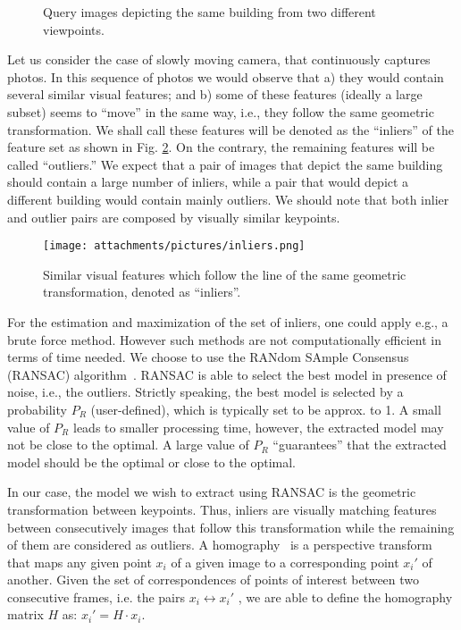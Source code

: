     \begin{figure}[htp!]
        \centering
        \caption{Query images depicting the same building from two different viewpoints.}
        \label{fig:demo_features}
    \end{figure}
    
Let us consider the case of slowly moving camera, that continuously captures photos. In this sequence of photos we would observe that  a) they
would contain several similar visual features; and b) some of these
features (ideally a large subset) seems to ``move'' in the same way, i.e., they follow the same geometric transformation. We shall call these features will be denoted as the ``inliers'' of the feature set as shown in Fig. \ref{fig:inliers}. On the contrary, the remaining features will be called ``outliers.'' We expect that a pair of images that depict the same building should contain a large number of inliers, while a pair that would depict a different building would contain mainly outliers. We should note that both inlier and outlier pairs are composed by visually similar keypoints.

\begin{figure}[htp!]
  \centering
  \texttt{[image: attachments/pictures/inliers.png]}
  \caption{Similar visual features which follow the line of the same geometric transformation, denoted as ``inliers''.}
  \label{fig:inliers}
\end{figure}

For the estimation and maximization of the set of inliers, one could apply e.g., a brute force method. However such methods are not computationally efficient in terms of time needed. We choose to use the RANdom SAmple Consensus (RANSAC) algorithm~\cite{fischler1981random}. RANSAC is able to select the best model in presence of noise, i.e., the outliers. Strictly speaking, the best model is selected by a probability $P_R$ (user-defined), which is typically set to be approx. to 1. A small value of $P_R$ leads to smaller processing time, however, the extracted model may not be close to the optimal. A large value of $P_R$ ``guarantees'' that the extracted model should be the optimal or close to the optimal.

In our case, the model we wish to extract using RANSAC is the geometric transformation between keypoints. 
Thus, inliers are visually matching features between
consecutively images that follow this transformation 
while the remaining of them are considered as outliers.
A homography~\cite{hartley2003multiple} is a perspective transform that maps any given point $x_i$ of a given image to a corresponding point $x_i'$ of another. Given the set of correspondences of points of interest between two consecutive frames, i.e. the pairs $x_i\leftrightarrow x_i'$ , we are able to define the homography matrix $H$ as: $x_i' = H\cdot x_i$.

